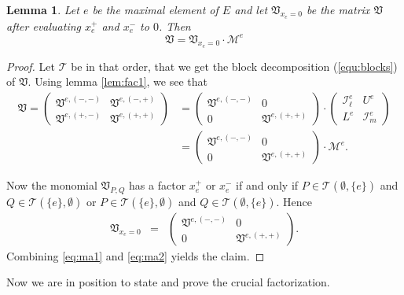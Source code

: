\documentclass[12pt]{amsart}
\def\Var{{\mathfrak V}}
\def\Tscr{{\mathcal T}}
\theoremstyle{plain}
\newtheorem{Lemma}{Lemma}
\numberwithin{Lemma}{\DefaultNumberTheoremWithin}
\numberwithin{Claim}{\DefaultNumberTheoremWithin}
\numberwithin{Theorem}{\DefaultNumberTheoremWithin}
\numberwithin{Corollary}{\DefaultNumberTheoremWithin}
\numberwithin{Proposition}{\DefaultNumberTheoremWithin}
\numberwithin{Conjecture}{\DefaultNumberTheoremWithin}
\numberwithin{Situation}{\DefaultNumberTheoremWithin}
\numberwithin{Note}{\DefaultNumberTheoremWithin}
\theoremstyle{definition}
\numberwithin{Definition}{\DefaultNumberTheoremWithin}
\theoremstyle{definition}
\numberwithin{Question}{\DefaultNumberTheoremWithin}
\theoremstyle{definition}
\numberwithin{Problem}{\DefaultNumberTheoremWithin}
\theoremstyle{remark} \newtheorem{Remark}{Remark}
\numberwithin{Remark}{\DefaultNumberTheoremWithin}
\theoremstyle{remark}
\numberwithin{Example}{\DefaultNumberTheoremWithin}
\numberwithin{Case}{Lemma}
\numberwithin{Step}{Lemma}
\begin{document}
\begin{Lemma}
  \label{lem:fac}
  Let $e$ be the maximal element of $E$ and
  let $\Var_{x_e = 0}$ be the matrix $\Var$ after
  evaluating $x_{e}^+$ and $x_{e}^-$ to $0$. 
  Then 
  $$\Var = \Var_{x_e = 0} \cdot \mathcal{M}^e 
  $$
\end{Lemma}
\begin{proof}
Let $\Tscr$ be in that order, that we get the block decomposition (\ref{equ:blocks}) of $\Var$. Using lemma \ref{lem:fac1}, we see that
\begin{align}\label{eq:ma1}
\Var = \left( 
       \begin{array}{cc} 
         \Var^{e,(-,-)} & \Var^{e,(-,+)} \\ 
         \Var^{e,(+,-)} & \Var^{e,(+,+)} 
       \end{array}
      \right) & = \left( 
       \begin{array}{cc} 
         \Var^{e,(-,-)} & 0 \\ 
         0 & \Var^{e,(+,+)} 
       \end{array}
       \right) \cdot 
       \left( 
       \begin{array}{cc} 
         \mathcal{I}^e_{\ell}  & U^e  \\ 
         L^e  & \mathcal{I}^e_{m} 
       \end{array}
       \right) \\
      &=   \left( 
       \begin{array}{cc} 
	 \Var^{e,(-,-)} & 0 \\ 
	 0 & \Var^{e,(+,+)} 
       \end{array}
       \right) \cdot \mathcal{M}^e .
\end{align}

   Now the monomial $\Var_{P,Q}$ has a factor $x_{e}^+$ or $x_{e}^-$ if and only if
   $P \in \Tscr(\emptyset,\{e\})$ and $Q \in \Tscr(\{e\},\emptyset)$ or
   $P \in \Tscr(\{e\},\emptyset)$ and $Q \in \Tscr(\emptyset,\{e\})$.
   Hence 
   \begin{eqnarray}
     \label{eq:ma2}
     \Var_{x_e = 0}  & = & \left( 
        \begin{array}{cc} 
           \Var^{e,(-,-)} & 0 \\ 
	   0 & \Var^{e,(+,+)} 
	\end{array} 
	\right).
   \end{eqnarray}
   Combining \eqref{eq:ma1} and \eqref{eq:ma2} yields the claim.
\end{proof}

Now we are in position to state and prove the crucial factorization.
\end{document}
